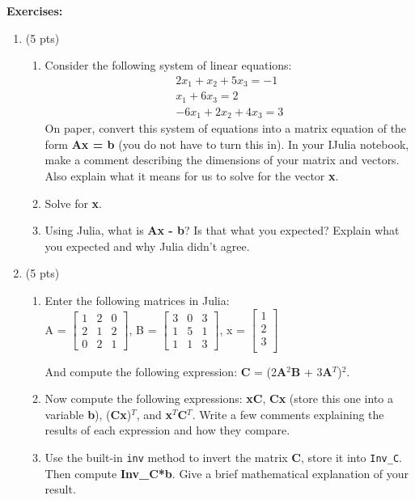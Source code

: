 \documentclass[11pt,a4paper,oneside]{report}
\begin{document}
{\bf Exercises:}
\begin{enumerate}
\item (5 pts)
\begin{enumerate}
\item Consider the following system of linear equations:
\begin{eqnarray*}
2x_1 + x_2 + 5x_3 = -1\\
x_1 + 6x_3 = 2\\
-6x_1 + 2x_2 + 4x_3 = 3
\end{eqnarray*}
On paper, convert this system of equations into a matrix equation of the form {\bf Ax = b} (you do not have to turn this in). In your IJulia notebook, make a comment describing the dimensions of your matrix and vectors. Also explain what it means for us to solve for the vector {\bf x}.
\item Solve for {\bf x}.
\item Using Julia, what is {\bf Ax - b}? Is that what you expected? Explain what you expected and why Julia didn't agree.
\end{enumerate}
\item (5 pts)
\begin{enumerate}
\item Enter the following matrices in Julia:\\
A = 
$\begin{bmatrix}
1 & 2 & 0 \\
2 & 1 & 2 \\
0 & 2 & 1
\end{bmatrix}$, B = 
$\begin{bmatrix}
3 & 0 & 3 \\
1 & 5 & 1 \\
1 & 1 & 3
\end{bmatrix}$, x = 
$\begin{bmatrix}
1\\
2\\
3\\
\end{bmatrix}$

And compute the following expression:
{\bf C} = (2{\bf A}$^2${\bf B} + 3{\bf A}$^T$)$^2$.

\item Now compute the following expressions: {\bf xC}, {\bf Cx} (store this one into a variable {\bf b}), ({\bf Cx})$^T$, and {\bf x}$^T${\bf C}$^T$. Write a few comments explaining the results of each expression and how they compare.

\item Use the built-in \verb+inv+ method to invert the matrix {\bf C}, store it into \verb+Inv_C+. Then compute {\bf Inv\_C*b}. Give a brief mathematical explanation of your result.
\end{enumerate}


\end{enumerate}
\end{document}
